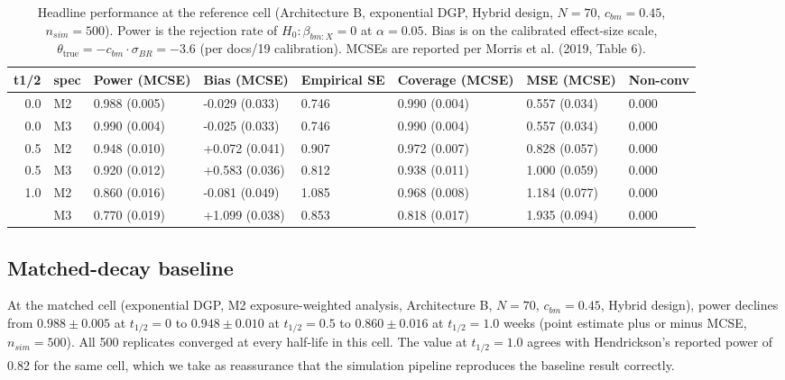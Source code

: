 \documentclass[
  11pt,
]{article}
\begin{document}
\begin{table}

\caption{\label{tab:headline}Headline performance at the reference cell
    (Architecture B, exponential DGP, Hybrid design, $N = 70$,
    $c_{bm} = 0.45$, $n_{sim} = 500$). Power is the rejection rate of
    $H_0: \beta_{bm:X} = 0$ at $\alpha = 0.05$. Bias is on the
    calibrated effect-size scale,
    $\theta_{\text{true}} = -c_{bm} \cdot \sigma_{BR} = -3.6$
    (per docs/19 calibration). MCSEs are reported per Morris et al.
    (2019, Table 6).}
\centering
\begin{tabular}[t]{rlllllll}
\toprule
t1/2 & spec & Power (MCSE) & Bias (MCSE) & Empirical SE & Coverage (MCSE) & MSE (MCSE) & Non-conv\\
\midrule
0.0 & M2 & 0.988 (0.005) & -0.029 (0.033) & 0.746 & 0.990 (0.004) & 0.557 (0.034) & 0.000\\
0.0 & M3 & 0.990 (0.004) & -0.025 (0.033) & 0.746 & 0.990 (0.004) & 0.557 (0.034) & 0.000\\
0.5 & M2 & 0.948 (0.010) & +0.072 (0.041) & 0.907 & 0.972 (0.007) & 0.828 (0.057) & 0.000\\
0.5 & M3 & 0.920 (0.012) & +0.583 (0.036) & 0.812 & 0.938 (0.011) & 1.000 (0.059) & 0.000\\
1.0 & M2 & 0.860 (0.016) & -0.081 (0.049) & 1.085 & 0.968 (0.008) & 1.184 (0.077) & 0.000\\
\addlinespace
1.0 & M3 & 0.770 (0.019) & +1.099 (0.038) & 0.853 & 0.818 (0.017) & 1.935 (0.094) & 0.000\\
\bottomrule
\end{tabular}
\end{table}

\subsection{Matched-decay baseline}\label{matched-decay-baseline}

At the matched cell (exponential DGP, M2 exposure-weighted analysis,
Architecture B, \(N = 70\), \(c_{bm} = 0.45\), Hybrid design), power
declines from \(0.988 \pm 0.005\) at \(t_{1/2} = 0\) to
\(0.948 \pm 0.010\) at \(t_{1/2} = 0.5\) to \(0.860 \pm 0.016\) at
\(t_{1/2} = 1.0\) weeks (point estimate plus or minus MCSE,
\(n_{sim} = 500\)). All 500 replicates converged at every half-life in
this cell. The value at \(t_{1/2} = 1.0\) agrees with Hendrickson's
reported power of 0.82 for the same cell\textsuperscript{}, which
we take as reassurance that the simulation pipeline reproduces the
baseline result correctly.
\end{document}
